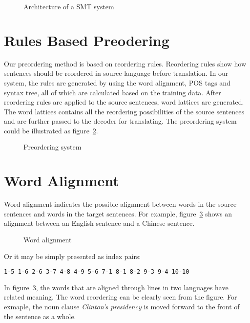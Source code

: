 \begin{figure}
\centering

\caption{Architecture of a \ac{SMT} system}
\label{smt}
\end{figure}

\section{Rules Based Preodering}
\label{ch:Foundations:sec:PreReorderingSystem}

Our preordering method is based on reordering rules. Reordering rules show how sentences should be reordered in source language before translation. In our system, the rules are generated by using the word alignment, \ac{POS} tags and syntax tree, all of which are calculated based on the training data. After reordering rules are applied to the source sentences, word lattices are generated. The word lattices contains all the reordering possibilities of the source sentences and are further passed to the decoder for translating. The preordering system could be illustrated as figure~\ref{prereordering}.

\begin{figure}
\centering

\caption{Preordering system}
\label{prereordering}
\end{figure}


\section{Word Alignment}
\label{ch:Foundations:sec:Alignment}

Word alignment indicates the possible alignment between words in the source sentences and words in the target sentences. For example, figure~\ref{alignment} shows an alignment between an English sentence and a Chinese sentence.

\begin{figure}[H]
\centering

\caption{Word alignment}
\label{alignment}
\end{figure}
Or it may be simply presented as index pairs:
\begin{center}
\texttt{1-5 1-6 2-6 3-7 4-8 4-9 5-6 7-1 8-1 8-2 9-3 9-4 10-10}
\end{center}

In figure~\ref{alignment}, the words that are aligned through lines in two languages have related meaning. The word reordering can be clearly seen from the figure. For exmaple, the noun clause \emph{Clinton's presidency} is moved forward to the front of the sentence as a whole.

